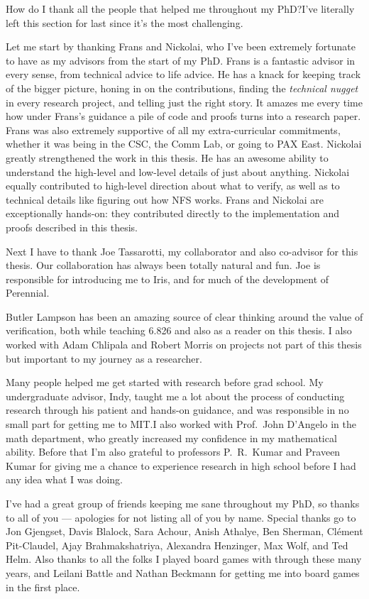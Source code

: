 How do I thank all the people that helped me throughout my PhD?\@ I've literally
left this section for last since it's the most challenging.

Let me start by thanking Frans and Nickolai, who I've been extremely fortunate
to have as my advisors from the start of my PhD. Frans is a fantastic advisor in
every sense, from technical advice to life advice. He has a knack for keeping
track of the bigger picture, honing in on the contributions, finding the
\emph{technical nugget} in every research project, and telling just the right
story. It amazes me every time how under Frans's guidance a pile of code and
proofs turns into a research paper. Frans was also extremely supportive of all
my extra-curricular commitments, whether it was being in the CSC, the Comm Lab,
or going to PAX East. Nickolai greatly strengthened the work in this thesis. He
has an awesome ability to understand the high-level and low-level details of
just about anything. Nickolai equally contributed to high-level direction about
what to verify, as well as to technical details like figuring out how NFS works.
Frans and Nickolai are exceptionally hands-on: they contributed directly to the
implementation and proofs described in this thesis.

Next I have to thank Joe Tassarotti, my collaborator and also co-advisor for
this thesis. Our collaboration has always been totally natural and fun. Joe is
responsible for introducing me to Iris, and for much of the development of
Perennial.

Butler Lampson has been an amazing source of clear thinking around the value of
verification, both while teaching 6.826 and also as a reader on this thesis. I
also worked with Adam Chlipala and Robert Morris on projects not part of this
thesis but important to my journey as a researcher.

Many people helped me get started with research before grad school. My
undergraduate advisor, Indy, taught me a lot about the process of conducting
research through his patient and hands-on guidance, and was responsible in no
small part for getting me to MIT.\@ I also worked with Prof.~John D'Angelo in
the math department, who greatly increased my confidence in my mathematical
ability. Before that I'm also grateful to professors P.~R.~Kumar and Praveen
Kumar for giving me a chance to experience research in high school before I had
any idea what I was doing.

I've had a great group of friends keeping me sane throughout my PhD, so thanks
to all of you --- apologies for not listing all of you by name. Special thanks
go to Jon Gjengset, Davis Blalock, Sara Achour, Anish Athalye, Ben Sherman,
Cl\'ement Pit-Claudel, Ajay Brahmakshatriya, Alexandra Henzinger, Max Wolf, and
Ted Helm. Also thanks to all the folks I played board
games with through these many years, and Leilani Battle and Nathan Beckmann for
getting me into board games in the first place.

